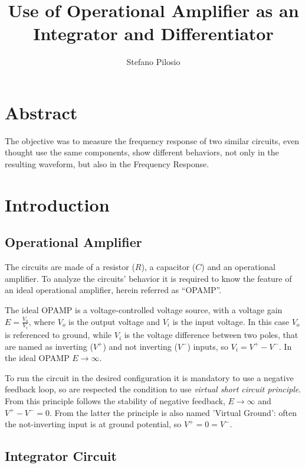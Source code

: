 \documentclass[a4paper, twocolumn]{article}
\begin{document}
\title{Use of Operational Amplifier as  an Integrator and Differentiator}
\author{Stefano Pilosio}

\maketitle


\section{Abstract}
The objective was to measure the frequency response of two similar circuits, even thought use the same components, show different behaviors, not only in the resulting waveform, but also in the Frequency Response.

\section{Introduction}

\subsection{Operational Amplifier} 

The circuits are made of a resistor ($R$), a capacitor ($C$) and an operational amplifier. To analyze the circuits' behavior it is required to know the feature of an ideal operational amplifier, herein referred as ``OPAMP''.

The ideal OPAMP is a voltage-controlled voltage source, with a voltage gain $E = \frac{V_o}{V_i}$, where $V_o$ is the output voltage and $V_i$ is the input voltage. In this case $V_o$ is referenced to ground, while $V_i$ is the voltage difference between two poles, that are named as inverting ($V^+$) and not inverting ($V^-$) inputs, so $V_i=V^+-V^-$. In the ideal OPAMP $E\to\infty$.

To run the circuit in the desired configuration it is mandatory to use a negative feedback loop, so are respected the condition to use \emph{virtual short circuit principle}. From this principle follows the stability of negative feedback, $E\to\infty$ and $V^+-V^-=0$. From the latter the principle is also named 'Virtual Ground': often the not-inverting input is at ground potential, so $V^+=0=V^-$.

\subsection{Integrator Circuit}
\label{sec:integr}
\end{document}
